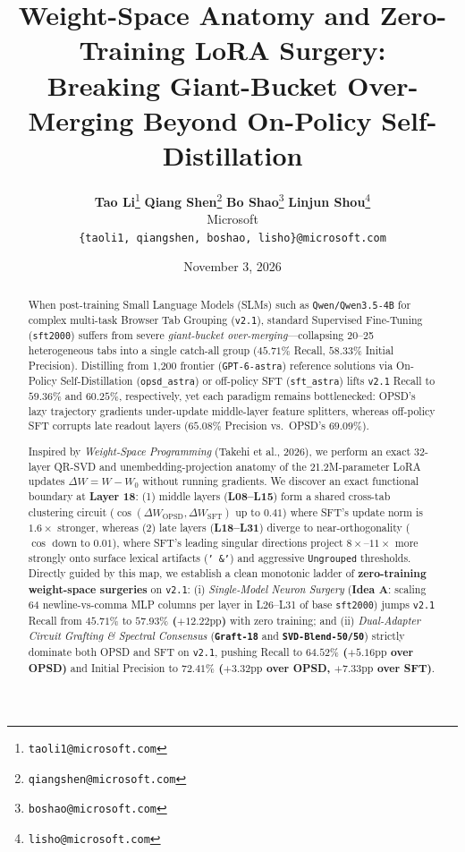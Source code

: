 \documentclass[11pt,a4paper]{article}
\title{\textbf{Weight-Space Anatomy and Zero-Training LoRA Surgery:\\Breaking Giant-Bucket Over-Merging Beyond On-Policy Self-Distillation}}
\author{
  \textbf{Tao Li}\thanks{\texttt{taoli1@microsoft.com}} \quad
  \textbf{Qiang Shen}\thanks{\texttt{qiangshen@microsoft.com}} \quad
  \textbf{Bo Shao}\thanks{\texttt{boshao@microsoft.com}} \quad
  \textbf{Linjun Shou}\thanks{\texttt{lisho@microsoft.com}} \\[4pt]
  Microsoft\\
  \texttt{\{taoli1, qiangshen, boshao, lisho\}@microsoft.com}
}
\date{November 3, 2026}
\begin{document}
\maketitle

\begin{abstract}
When post-training Small Language Models (SLMs) such as \texttt{Qwen/Qwen3.5-4B} for complex multi-task Browser Tab Grouping (\texttt{v2.1}), standard Supervised Fine-Tuning (\texttt{sft2000}) suffers from severe \emph{giant-bucket over-merging}—collapsing 20--25 heterogeneous tabs into a single catch-all group ($45.71\%$ Recall, $58.33\%$ Initial Precision). Distilling from 1,200 frontier (\texttt{GPT-6-astra}) reference solutions via On-Policy Self-Distillation (\texttt{opsd\_astra}) or off-policy SFT (\texttt{sft\_astra}) lifts \texttt{v2.1} Recall to $59.36\%$ and $60.25\%$, respectively, yet each paradigm remains bottlenecked: OPSD's lazy trajectory gradients under-update middle-layer feature splitters, whereas off-policy SFT corrupts late readout layers ($65.08\%$ Precision vs.\ OPSD's $69.09\%$).

Inspired by \emph{Weight-Space Programming} (Takehi et al., 2026), we perform an exact 32-layer QR-SVD and unembedding-projection anatomy of the 21.2M-parameter LoRA updates $\Delta W = W - W_0$ without running gradients. We discover an exact functional boundary at \textbf{Layer 18}: (1) middle layers (\textbf{L08--L15}) form a shared cross-tab clustering circuit ($\cos(\Delta W_{\text{OPSD}}, \Delta W_{\text{SFT}}) \text{ up to } 0.41$) where SFT's update norm is $1.6\times$ stronger, whereas (2) late layers (\textbf{L18--L31}) diverge to near-orthogonality ($\cos \text{ down to } 0.01$), where SFT's leading singular directions project $8\times$--$11\times$ more strongly onto surface lexical artifacts (\texttt{' \&'}) and aggressive \texttt{Ungrouped} thresholds. Directly guided by this map, we establish a clean monotonic ladder of \textbf{zero-training weight-space surgeries} on \texttt{v2.1}: (i) \emph{Single-Model Neuron Surgery} (\textbf{Idea A}: scaling 64 newline-vs-comma MLP columns per layer in L26--L31 of base \texttt{sft2000}) jumps \texttt{v2.1} Recall from $45.71\%$ to \textbf{$57.93\%$ ($+12.22\text{pp}$)} with zero training; and (ii) \emph{Dual-Adapter Circuit Grafting \& Spectral Consensus} (\textbf{\texttt{Graft-18}} and \textbf{\texttt{SVD-Blend-50/50}}) strictly dominate both OPSD and SFT on \texttt{v2.1}, pushing Recall to \textbf{$64.52\%$ ($+5.16\text{pp}$ over OPSD)} and Initial Precision to \textbf{$72.41\%$ ($+3.32\text{pp}$ over OPSD, $+7.33\text{pp}$ over SFT)}.
\end{abstract}
\end{document}
